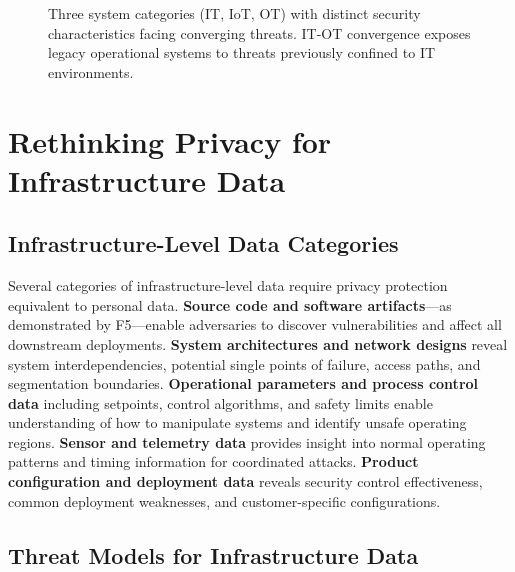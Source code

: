 \documentclass[sigconf,nonacm]{acmart}
\begin{document}
\begin{figure}[t]
\caption{Three system categories (IT, IoT, OT) with distinct security characteristics
  facing converging threats. IT-OT convergence exposes legacy operational systems to
  threats previously confined to IT environments.}
\label{fig:system_types}
\end{figure}

\section{Rethinking Privacy for Infrastructure Data}

\subsection{Infrastructure-Level Data Categories}

Several categories of infrastructure-level data require privacy protection equivalent
to personal data. \textbf{Source code and software artifacts}---as demonstrated by
F5---enable adversaries to discover vulnerabilities and affect all downstream
deployments. \textbf{System architectures and network designs} reveal system
interdependencies, potential single points of failure, access paths, and segmentation
boundaries. \textbf{Operational parameters and process control data} including setpoints,
control algorithms, and safety limits enable understanding of how to manipulate systems
and identify unsafe operating regions. \textbf{Sensor and telemetry data} provides
insight into normal operating patterns and timing information for coordinated attacks.
\textbf{Product configuration and deployment data} reveals security control
effectiveness, common deployment weaknesses, and customer-specific configurations.

\subsection{Threat Models for Infrastructure Data}
\end{document}
